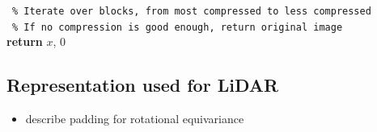 \documentclass[colorinlistoftodos]{article} %
\begin{document}
\begin{minipage}{\textwidth}
\begin{minipage}{0.49\textwidth}
\begin{algorithm2e}[H]
\,\,\,\texttt{\% Iterate over blocks, from most compressed to less compressed}\\
\,\,\,\texttt{\% If no compression is good enough, return original image} \\
\textbf{return} $x$, 0
\caption{}
\label{algo:vqr}
\end{algorithm2e}
\end{minipage}
\end{minipage}






\subsection{Representation used for LiDAR}
\begin{itemize}
    \item describe padding for rotational equivariance
\end{itemize}

\end{document}
